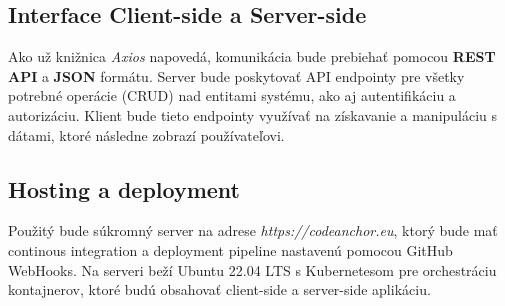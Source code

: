 \subsection{Interface Client-side a Server-side}
Ako už knižnica \textit{Axios} napovedá, komunikácia bude prebiehať pomocou \textbf{REST API} a \textbf{JSON} formátu. 
Server bude poskytovať API endpointy pre všetky potrebné operácie (CRUD) nad entitami systému, ako aj autentifikáciu a autorizáciu. 
Klient bude tieto endpointy využívať na získavanie a manipuláciu s dátami, ktoré následne zobrazí používateľovi.

\subsection{Hosting a deployment}
Použitý bude súkromný server na adrese \textit{https://codeanchor.eu}, ktorý bude mať continous integration a deployment pipeline nastavenú pomocou GitHub WebHooks.
Na serveri beží Ubuntu 22.04 LTS s Kubernetesom pre orchestráciu kontajnerov, ktoré budú obsahovať client-side a server-side aplikáciu.